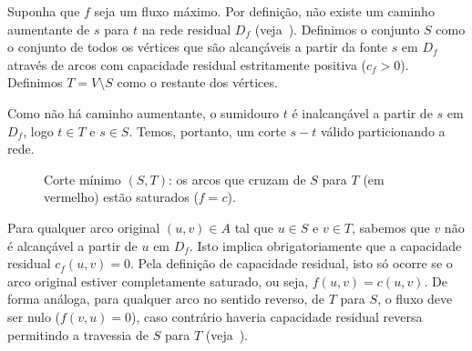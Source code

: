 \documentclass[12pt,a4paper]{article}
\begin{document}
Suponha que $f$ seja um fluxo máximo. Por definição, não existe um caminho aumentante de $s$ para $t$ na rede residual $D_f$ (veja~\cite{ahuja1993network}). Definimos o conjunto $S$ como o conjunto de todos os vértices que são alcançáveis a partir da fonte $s$ em $D_f$ através de arcos com capacidade residual estritamente positiva ($c_f > 0$). Definimos $T = V \setminus S$ como o restante dos vértices.

Como não há caminho aumentante, o sumidouro $t$ é inalcançável a partir de $s$ em $D_f$, logo $t \in T$ e $s \in S$. Temos, portanto, um corte $s-t$ válido particionando a rede.

\begin{figure}[h]
\centering
{}
\caption{Corte mínimo $(S,T)$: os arcos que cruzam de $S$ para $T$ (em vermelho) estão saturados ($f = c$).}
\label{fig:min_cut}
\end{figure}

Para qualquer arco original $(u,v) \in A$ tal que $u \in S$ e $v \in T$, sabemos que $v$ não é alcançável a partir de $u$ em $D_f$. Isto implica obrigatoriamente que a capacidade residual $c_f(u,v) = 0$. Pela definição de capacidade residual, isto só ocorre se o arco original estiver completamente saturado, ou seja, $f(u,v) = c(u,v)$. De forma análoga, para qualquer arco no sentido reverso, de $T$ para $S$, o fluxo deve ser nulo ($f(v,u) = 0$), caso contrário haveria capacidade residual reversa permitindo a travessia de $S$ para $T$ (veja~\cite{cook1998combinatorial}).
\end{document}

